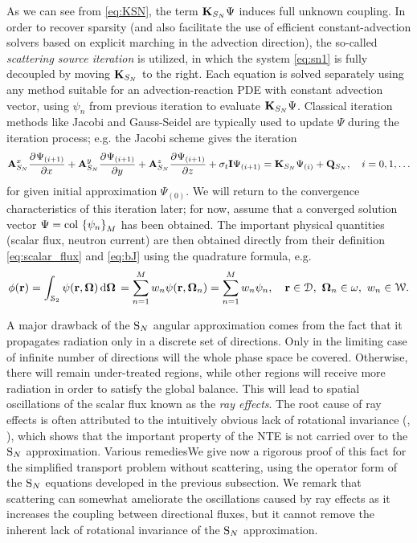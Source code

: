 As we can see from \eqref{eq:KSN}, the term $\mathbf{K}_{S_N}\Psi$ induces full unknown coupling. In order to recover 
sparsity (and also facilitate the use of efficient constant-advection solvers based on explicit marching in the advection direction), the so-called  \textit{scattering
source iteration} is utilized, in which the system \eqref{eq:sn1} is fully decoupled by moving $\mathbf{K}_{S_N}$ to the
right. Each equation is solved separately using any method suitable for an advection-reaction PDE with constant
advection vector, using $\psi_n$ from previous iteration to evaluate $\mathbf{K}_{S_N}\Psi$. Classical iteration methods
like Jacobi and Gauss-Seidel are typically used to update $\Psi$ during the iteration process; e.g. the Jacobi scheme 
gives the iteration
\begin{equation}\label{eq:SI}
	\mathbf{A}_{S_N}^x\frac{\partial^{}\Psi_{(i+1)}}{\partial x^{}} + \mathbf{A}_{S_N}^y\frac{\partial^{}\Psi_{(i+1)}}{\partial y^{}} +
	\mathbf{A}_{S_N}^z\frac{\partial^{}\Psi_{(i+1)}}{\partial z^{}} + \sigma_t\mathbf{I}\Psi_{(i+1)}= \mathbf{K}_{S_N}\Psi_{(i)} +
	\mathbf{Q}_{S_N},\quad
	i = 0,1,\ldots
\end{equation}
for given initial approximation $\Psi_{(0)}$. We will return to the convergence characteristics of this iteration later;
for now, assume that a converged solution vector $\Psi = \operatorname{col\,}\left\{\psi_n\right\}_{M}$ has been obtained. The important physical
quantities (scalar flux, neutron current) are then obtained directly from their definition \eqref{eq:scalar_flux} and \eqref{eq:bJ} using
the quadrature formula, e.g.
$$
	\phi(\mathbf{r}) = \int_{\mathcal{S}_2}\psi(\mathbf{r},\mathbf{\Omega})\,\text{d}\mathbf{\Omega}\, = \sum_{n=1}^{M} w_n \psi(\mathbf{r},\mathbf{\Omega}_n) = \sum_{n=1}^{M} w_n \psi_n, \quad \mathbf{r}\in
	\mathcal{D},\ \mathbf{\Omega}_n\in \omega,\ w_n\in \mathcal{W}.
$$

A major drawback of the $\text{S}_{N}$ angular approximation comes from the fact that it propagates radiation 
only in a discrete set of directions. Only in the limiting case of infinite number of directions will the
whole phase space be covered. Otherwise, there will remain under-treated regions, while other regions will receive more radiation in order
to satisfy the global balance. This will lead to spatial oscillations of the scalar flux  known as the \textit{ray
effects}. The root cause of ray effects is often attributed to the intuitively obvious lack of rotational invariance 
(\cite{Reuss}, \cite{Sanchez6}), which shows that the important property of the NTE is not carried over to the $\text{S}_{N}$
approximation. Various remediesWe give now a rigorous proof of this fact for the simplified transport problem without
scattering, using the operator form of the $\text{S}_{N}$ equations developed in the previous subsection. We remark that scattering can somewhat ameliorate the
 oscillations caused by ray effects as it increases the coupling between directional fluxes, but it cannot remove the
 inherent lack of rotational invariance of the $\text{S}_{N}$ approximation.




